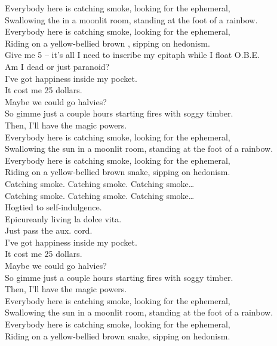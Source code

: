 Everybody here is catching smoke, looking for the ephemeral, \\
Swallowing the  in a moonlit room, standing at the foot of a rainbow. \\
Everybody here is catching smoke, looking for the ephemeral, \\
Riding on a yellow-bellied brown , sipping on hedonism. \\

Give me 5 -- it's all I need to inscribe my epitaph while I float O.B.E. \\
Am I dead or just paranoid? \\

I've got happiness inside my pocket. \\
It cost me 25 dollars. \\
Maybe we could go halvies? \\
So gimme just a couple hours starting fires with soggy timber. \\
Then, I'll have the magic powers. \\

Everybody here is catching smoke, looking for the ephemeral, \\
Swallowing the sun in a moonlit room, standing at the foot of a rainbow. \\
Everybody here is catching smoke, looking for the ephemeral, \\
Riding on a yellow-bellied brown snake, sipping on hedonism. \\

Catching smoke. Catching smoke. Catching smoke… \\
Catching smoke. Catching smoke. Catching smoke… \\

Hogtied to self-indulgence. \\
Epicureanly living la dolce vita. \\
Just pass the aux. cord. \\

I've got happiness inside my pocket. \\
It cost me 25 dollars. \\
Maybe we could go halvies? \\
So gimme just a couple hours starting fires with soggy timber. \\
Then, I'll have the magic powers. \\

Everybody here is catching smoke, looking for the ephemeral, \\
Swallowing the sun in a moonlit room, standing at the foot of a rainbow. \\
Everybody here is catching smoke, looking for the ephemeral, \\
Riding on a yellow-bellied brown snake, sipping on hedonism. \\

